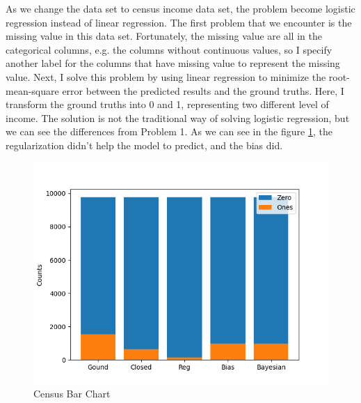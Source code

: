 \documentclass{../../Latex_Template/Homework/homework}
\begin{document}
As we change the data set to census income data set, the problem become
logistic regression instead of linear regression. The first problem that we
encounter is the missing value in this data set. Fortunately, the missing value
are all in the categorical columns, e.g. the columns without continuous values,
so I specify another label for the columns that have missing value to represent
the missing value. Next, I solve this problem by using linear regression to
minimize the root-mean-square error between the predicted results and the ground
truths. Here, I transform the ground truths into 0 and 1, representing two
different level of income. The solution is not the traditional way of solving
logistic regression, but we can see the differences from Problem 1. As we can
see in the figure \ref{fig:census_bar_chart}, the regularization didn't help
the model to predict, and the bias did.
    
\begin{figure}[h]
  \centering
  \includegraphics[width=0.5\linewidth]{census_bar_chart}
  \caption{Census Bar Chart}
  \label{fig:census_bar_chart}
\end{figure}
\end{document}
